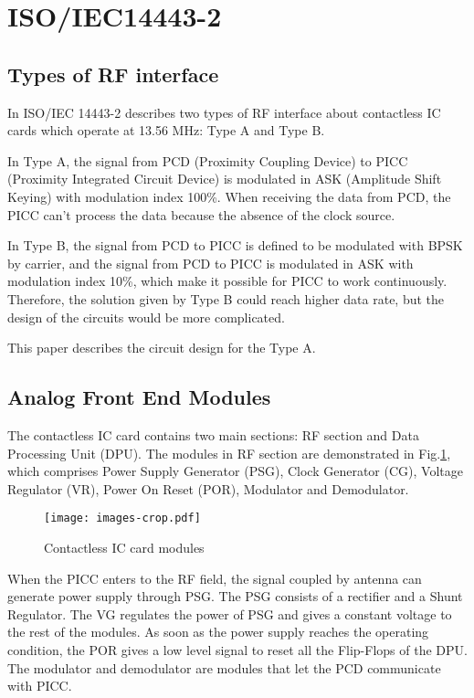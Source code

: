 \documentclass[conference]{../../resources/IEEEtran/IEEEtran}
\begin{document}

\section{ISO/IEC14443-2}
\label{sec:iso}

\subsection{Types of RF interface}
In ISO/IEC 14443-2 describes two types of RF interface about contactless IC cards which operate at 13.56 MHz: Type A and Type B. 

In Type A, the signal from PCD (Proximity Coupling Device) to PICC (Proximity Integrated Circuit Device) is modulated in ASK (Amplitude Shift Keying) with modulation index 100\%. When receiving the data from PCD, the PICC can’t process the data because the absence of the clock source. 

In Type B,  the signal from PCD to PICC is defined to be modulated with BPSK by carrier, and the signal from PCD to PICC is modulated in ASK with modulation index 10\%, which make it possible for PICC to work continuously. Therefore, the solution given by Type B could reach higher data rate, but the design of the circuits would be more complicated.

This paper describes the circuit design for the Type A. 


\subsection{Analog Front End Modules}

The contactless IC card contains two main sections: RF section and Data Processing Unit (DPU). The modules in RF section are demonstrated in Fig.\ref{fig:modules}, which comprises Power Supply Generator (PSG), Clock Generator (CG), Voltage Regulator (VR), Power On Reset (POR), Modulator  and Demodulator. 

\begin{figure}[]
  \centering
  \texttt{[image: images-crop.pdf]}
  \caption{Contactless IC card modules}
  \label{fig:modules}
\end{figure}

When the PICC enters to the RF field, the signal coupled by antenna can generate power supply through PSG. The PSG consists of a rectifier and a Shunt Regulator. The VG regulates the power of PSG and gives a constant voltage to the rest of the modules. As soon as the power supply reaches the operating condition, the POR gives a low level signal to reset all the Flip-Flops of the DPU. The modulator and demodulator are modules that let the PCD communicate with PICC.
\end{document}
